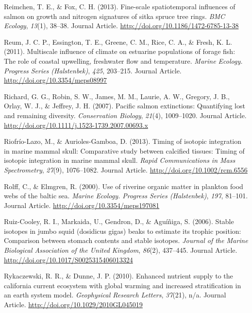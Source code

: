 \documentclass [11pt, proquest] {uwthesis}[2015/03/03]
\begin{document}
\hypertarget{ref-Reimchen2013}{}
Reimchen, T. E., \& Fox, C. H. (2013). Fine-scale spatiotemporal
influences of salmon on growth and nitrogen signatures of sitka spruce
tree rings. \emph{BMC Ecology}, \emph{13}(1), 38--38. Journal Article.
\url{http://doi.org/10.1186/1472-6785-13-38}

\hypertarget{ref-Reum2011}{}
Reum, J. C. P., Essington, T. E., Greene, C. M., Rice, C. A., \& Fresh,
K. L. (2011). Multiscale influence of climate on estuarine populations
of forage fish: The role of coastal upwelling, freshwater flow and
temperature. \emph{Marine Ecology. Progress Series (Halstenbek)},
\emph{425}, 203--215. Journal Article.
\url{http://doi.org/10.3354/meps08997}

\hypertarget{ref-Gustafson2007}{}
Richard, G. G., Robin, S. W., James, M. M., Laurie, A. W., Gregory, J.
B., Orlay, W. J., \& Jeffrey, J. H. (2007). Pacific salmon extinctions:
Quantifying lost and remaining diversity. \emph{Conservation Biology},
\emph{21}(4), 1009--1020. Journal Article.
\url{http://doi.org/10.1111/j.1523-1739.2007.00693.x}

\hypertarget{ref-Riofrio2013}{}
Riofrío-Lazo, M., \& Aurioles-Gamboa, D. (2013). Timing of isotopic
integration in marine mammal skull: Comparative study between calcified
tissues: Timing of isotopic integration in marine mammal skull.
\emph{Rapid Communications in Mass Spectrometry}, \emph{27}(9),
1076--1082. Journal Article. \url{http://doi.org/10.1002/rcm.6556}

\hypertarget{ref-Rolff2000}{}
Rolff, C., \& Elmgren, R. (2000). Use of riverine organic matter in
plankton food webs of the baltic sea. \emph{Marine Ecology. Progress
Series (Halstenbek)}, \emph{197}, 81--101. Journal Article.
\url{http://doi.org/10.3354/meps197081}

\hypertarget{ref-RuizCooley2006}{}
Ruiz-Cooley, R. I., Markaida, U., Gendron, D., \& Aguíñiga, S. (2006).
Stable isotopes in jumbo squid (dosidicus gigas) beaks to estimate its
trophic position: Comparison between stomach contents and stable
isotopes. \emph{Journal of the Marine Biological Association of the
United Kingdom}, \emph{86}(2), 437--445. Journal Article.
\url{http://doi.org/10.1017/S0025315406013324}

\hypertarget{ref-Rykaczewski2010}{}
Rykaczewski, R. R., \& Dunne, J. P. (2010). Enhanced nutrient supply to
the california current ecosystem with global warming and increased
stratification in an earth system model. \emph{Geophysical Research
Letters}, \emph{37}(21), n/a. Journal Article.
\url{http://doi.org/10.1029/2010GL045019}
\end{document}
